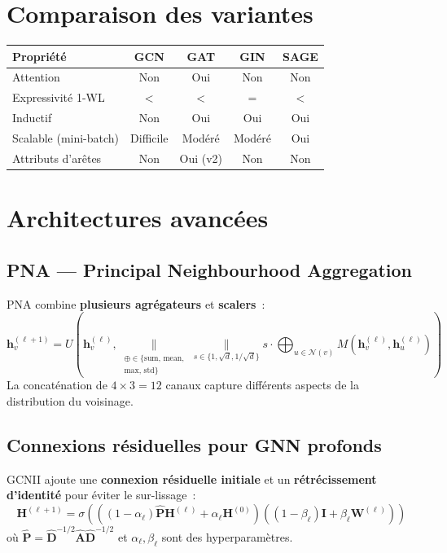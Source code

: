\section{Comparaison des variantes}

\begin{center}
\begin{tabular}{lcccc}
\toprule
\textbf{Propri\'et\'e} & \textbf{GCN} & \textbf{GAT} & \textbf{GIN} & \textbf{SAGE} \\
\midrule
Attention & Non & Oui & Non & Non \\
Expressivit\'e 1-WL & $<$ & $<$ & $=$ & $<$ \\
Inductif & Non & Oui & Oui & Oui \\
Scalable (mini-batch) & Difficile & Mod\'er\'e & Mod\'er\'e & Oui \\
Attributs d'ar\^etes & Non & Oui (v2) & Non & Non \\
\bottomrule
\end{tabular}
\end{center}

\section{Architectures avanc\'ees}

\subsection{PNA --- Principal Neighbourhood Aggregation}

\begin{definition}
PNA combine \textbf{plusieurs agr\'egateurs} et \textbf{scalers}~:
\[
    \mathbf{h}_v^{(\ell+1)} = U\!\left(\mathbf{h}_v^{(\ell)},
    \underset{\substack{\oplus \in \{\text{sum, mean,}\\\text{max, std}\}}}
    {\Big\|}
    \underset{s \in \{1, \sqrt{d}, 1/\sqrt{d}\}}{\Big\|}
    s \cdot \bigoplus_{u \in \mathcal{N}(v)} M(\mathbf{h}_v^{(\ell)},
    \mathbf{h}_u^{(\ell)})\right)
\]
La concat\'enation de $4 \times 3 = 12$ canaux capture diff\'erents aspects
de la distribution du voisinage.
\end{definition}

\subsection{Connexions r\'esiduelles pour GNN profonds}

\begin{definition}
GCNII ajoute une \textbf{connexion r\'esiduelle initiale} et un
\textbf{r\'etr\'ecissement d'identit\'e} pour \'eviter le sur-lissage~:
\[
    \mathbf{H}^{(\ell+1)} = \sigma\!\left(\left((1-\alpha_\ell)\hat{\mathbf{P}}
    \mathbf{H}^{(\ell)} + \alpha_\ell \mathbf{H}^{(0)}\right)
    \left((1-\beta_\ell)\mathbf{I} + \beta_\ell \mathbf{W}^{(\ell)}\right)\right)
\]
o\`u $\hat{\mathbf{P}} = \hat{\mathbf{D}}^{-1/2}\hat{\mathbf{A}}\hat{\mathbf{D}}^{-1/2}$
et $\alpha_\ell, \beta_\ell$ sont des hyperparam\`etres.
\end{definition}

